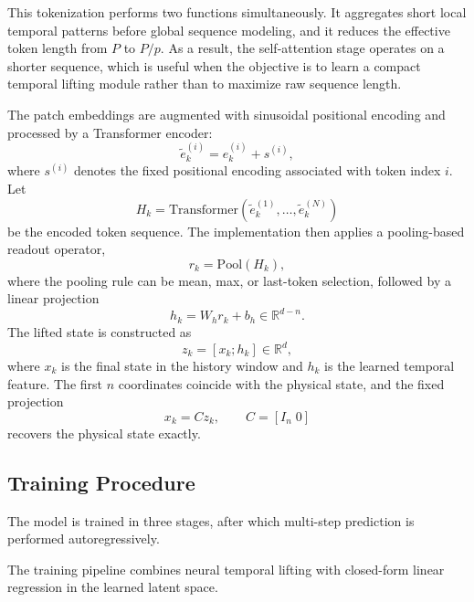 \documentclass[journal]{IEEEtran}
\begin{document}
This tokenization performs two functions simultaneously. It aggregates short local temporal patterns before global sequence modeling, and it reduces the effective token length from $P$ to $P/p$. As a result, the self-attention stage operates on a shorter sequence, which is useful when the objective is to learn a compact temporal lifting module rather than to maximize raw sequence length.

The patch embeddings are augmented with sinusoidal positional encoding and processed by a Transformer encoder:
\begin{equation}
    \tilde{e}_k^{(i)} = e_k^{(i)} + s^{(i)},
\end{equation}
where $s^{(i)}$ denotes the fixed positional encoding associated with token index $i$. Let
\begin{equation}
    H_k = \mathrm{Transformer}(\tilde{e}_k^{(1)},\ldots,\tilde{e}_k^{(N)})
\end{equation}
be the encoded token sequence. The implementation then applies a pooling-based readout operator,
\begin{equation}
    r_k = \mathrm{Pool}(H_k),
\end{equation}
where the pooling rule can be mean, max, or last-token selection, followed by a linear projection
\begin{equation}
    h_k = W_h r_k + b_h \in \mathbb{R}^{d-n}.
    \label{eq:history_feature}
\end{equation}
The lifted state is constructed as
\begin{equation}
    z_k = [x_k;h_k] \in \mathbb{R}^{d},
    \label{eq:lifted_state_form}
\end{equation}
where $x_k$ is the final state in the history window and $h_k$ is the learned temporal feature. The first $n$ coordinates coincide with the physical state, and the fixed projection
\begin{equation}
    x_k = C z_k, \qquad C = [I_n\;0]
    \label{eq:decoder_projection}
\end{equation}
recovers the physical state exactly.

\subsection{Training Procedure}
\label{sec:training}

The model is trained in three stages, after which multi-step prediction is performed autoregressively.

The training pipeline combines neural temporal lifting with closed-form linear regression in the learned latent space.
\end{document}
